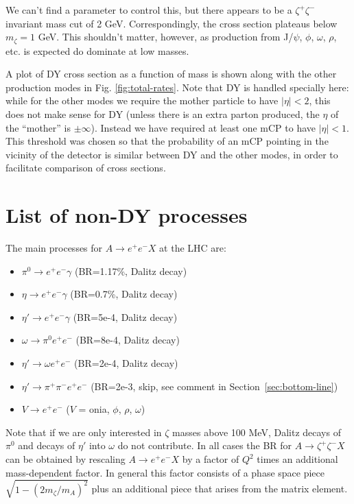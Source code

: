 \documentclass[12pt]{article}
\begin{document}
We can't find a parameter to control this, but there appears to be a $\zeta^+\zeta^-$ invariant
mass cut of 2 GeV. Correspondingly, the cross section plateaus below $m_\zeta = 1$ GeV. This shouldn't
matter, however, as production from J/$\psi$, $\phi$, $\omega$, $\rho$, etc. is expected do dominate
at low masses.

A plot of DY cross section as a function of mass is shown along with the other production modes
in Fig. \ref{fig:total-rates}. Note that DY is handled specially here: while for the other modes
we require the mother particle to have $|\eta|<2$, this does not make sense for DY (unless there
is an extra parton produced, the $\eta$ of the ``mother'' is $\pm\infty$). Instead we have required
at least one mCP to have $|\eta|<1$. This threshold was chosen so that the probability of
an mCP pointing in the vicinity of the detector is similar between DY and the other modes, in order
to facilitate comparison of cross sections.



\section{List of non-DY processes}
\label{sec:list}

The main processes for  $A \to e^+ e^- X$ at the LHC are:
\begin{itemize}
    \item $\pi^0 \to e^+ e^- \gamma$  (BR=1.17\%, Dalitz decay)
    \item $\eta \to e^+ e^- \gamma$   (BR=0.7\%, Dalitz decay)
    \item $\eta' \to e^+ e^- \gamma$   (BR=5e-4, Dalitz decay)
    \item $\omega \to \pi^0 e^+ e^-$  (BR=8e-4, Dalitz decay)
    \item $\eta' \to \omega e^+ e^-$ (BR=2e-4, Dalitz decay)
    \item $\eta' \to \pi^+ \pi^- e^+ e^-$ (BR=2e-3, skip, see comment in Section~\ref{sec:bottom-line})
    \item $V \to e^+ e^-$ ($V$ = onia, $\phi$, $\rho$, $\omega$)
\end{itemize}

Note that if we are only interested in $\zeta$ masses above 100 MeV,
Dalitz decays of $\pi^0$ and decays of $\eta'$ into $\omega$
do not contribute.
In all cases the BR for $A \to \zeta^+ \zeta^- X$ can be obtained
by rescaling $A \to e^+ e^- X$ by a factor of $Q^2$ times an
additional mass-dependent factor.  In general this factor consists
of a phase space piece $\sqrt{1 - (2m_\zeta/m_A)^2}$ plus an additional
piece that arises from the matrix element.
\end{document}
